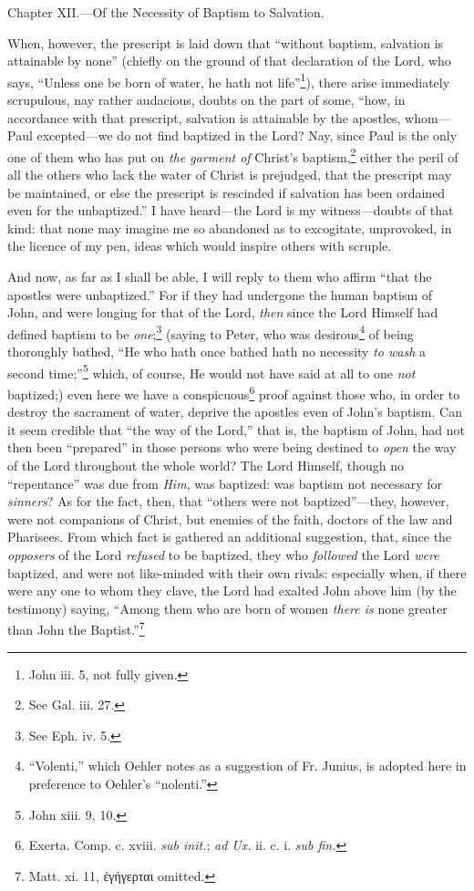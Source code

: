 
Chapter XII.—Of the Necessity of Baptism to Salvation.

When, however, the prescript is laid down that “without baptism, salvation is attainable by none” (chiefly on the ground of that declaration of the Lord, who says, “Unless one be born of water, he hath not life”\footnote{John iii. 5, not fully given.}), there arise immediately scrupulous, nay rather audacious, doubts on the part of some, “how, in accordance with that prescript, salvation is attainable by the apostles, whom—Paul excepted—we do not find baptized in the Lord? Nay, since Paul is the only one of them who has put on \emph{the garment of} Christ’s baptism,\footnote{See Gal. iii. 27.} either the peril of all the others who lack the water of Christ is prejudged, that the prescript may be maintained, or else the prescript is rescinded if salvation has been ordained even for the unbaptized.” I have heard—the Lord is my witness—doubts of that kind: that none may imagine me so abandoned as to excogitate, unprovoked, in the licence of my pen, ideas which would inspire others with scruple.

And now, as far as I shall be able, I will reply to them who affirm “that the apostles were unbaptized.” For if they had undergone the human baptism of John, and were longing for that of the Lord, \emph{then} since the Lord Himself had defined baptism to be \emph{one};\footnote{See Eph. iv. 5.} (saying to Peter, who was desirous\footnote{“Volenti,” which Oehler notes as a suggestion of Fr. Junius, is adopted here in preference to Oehler’s “nolenti.”} of being thoroughly bathed, “He who hath once bathed hath no necessity \emph{to wash} a second time;”\footnote{John xiii. 9, 10.} which, of course, He would not have said at all to one \emph{not} baptized;) even here we have a conspicuous\footnote{Exerta. Comp. c. xviii. \emph{sub init.}; \emph{ad Ux.} ii. c. i. \emph{sub fin.}} proof against those who, in order to destroy the sacrament of water, deprive the apostles even of John’s baptism. Can it seem credible that “the way of the Lord,” that is, the baptism of John, had not then been “prepared” in those persons who were being destined to \emph{open} the way of the Lord throughout the whole world? The Lord Himself, though no “repentance” was due from \emph{Him}, was baptized: was baptism not necessary for \emph{sinners}? As for the fact, then, that “others were not baptized”—they, however, were not companions of Christ, but enemies of the faith, doctors of the law and Pharisees. From which fact is gathered an additional suggestion, that, since the \emph{opposers} of the Lord \emph{refused} to be baptized, they who \emph{followed} the Lord \emph{were} baptized, and were not like-minded with their own rivals: especially when, if there were any one to whom they clave, the Lord had exalted John above him (by the testimony) saying, “Among them who are born of women \emph{there is} none greater than John the Baptist.”\footnote{Matt. xi. 11, \textgreek{ἐγήγερται} omitted.}

